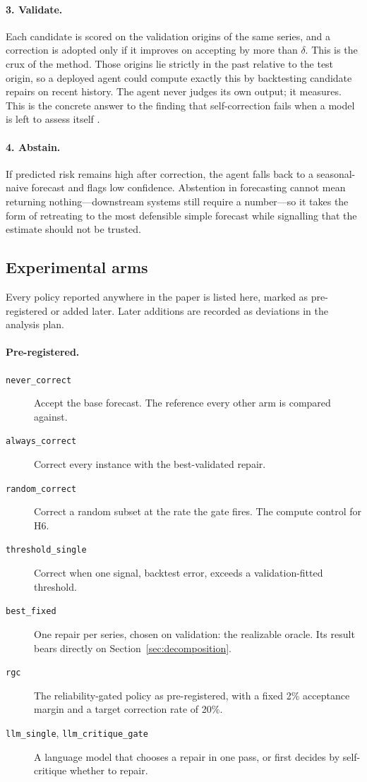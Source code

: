 \paragraph{3. Validate.}
Each candidate is scored on the validation origins of the same series, and a correction
is adopted only if it improves on accepting by more than $\delta$. This is the crux of
the method. Those origins lie strictly in the past relative to the test origin, so a
deployed agent could compute exactly this by backtesting candidate repairs on recent
history. The agent never judges its own output; it measures. This is the concrete answer
to the finding that self-correction fails when a model is left to assess itself
\citep{huang2024selfcorrect,kamoi2024selfcorrect}.

\paragraph{4. Abstain.}
If predicted risk remains high after correction, the agent falls back to a seasonal-naive
forecast and flags low confidence. Abstention in forecasting cannot mean returning
nothing---downstream systems still require a number---so it takes the form of retreating
to the most defensible simple forecast while signalling that the estimate should not be
trusted.

\subsection{Experimental arms}
\label{sec:arms}

Every policy reported anywhere in the paper is listed here, marked as pre-registered or
added later. Later additions are recorded as deviations in the analysis plan.

\paragraph{Pre-registered.}
\begin{description}
  \item[\texttt{never\_correct}] Accept the base forecast. The reference every other
  arm is compared against.
  \item[\texttt{always\_correct}] Correct every instance with the best-validated repair.
  \item[\texttt{random\_correct}] Correct a random subset at the rate the gate fires.
  The compute control for H6.
  \item[\texttt{threshold\_single}] Correct when one signal, backtest error, exceeds a
  validation-fitted threshold.
  \item[\texttt{best\_fixed}] One repair per series, chosen on validation: the
  realizable oracle. Its result bears directly on Section~\ref{sec:decomposition}.
  \item[\texttt{rgc}] The reliability-gated policy as pre-registered, with a fixed 2\%
  acceptance margin and a target correction rate of 20\%.
  \item[\texttt{llm\_single}, \texttt{llm\_critique\_gate}] A language model that
  chooses a repair in one pass, or first decides by self-critique whether to repair.
\end{description}

